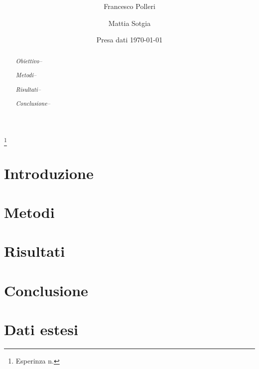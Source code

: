 \documentclass[
    reprint, 
    superscriptaddress, 
    altaffilletter, 
    amsmath, 
    amssymb, 
    a4paper]{revtex4-2}
\begin{document}
\title{
}
\thanks{
    Esperinza n. %
}

\author{Francesco Polleri}
\author{Mattia Sotgia}


\date{Presa dati
    \today
}

\begin{abstract}
    \textit{Obiettivo-- }
    
    \textit{Metodi-- }
    
    \textit{Risultati-- }
        
    \textit{Conclusione-- }
        
\end{abstract}
\maketitle
\thispagestyle{fancy}


\section{Introduzione}
\label{section:introduction}


\section{Metodi}
\label{section:methods}


\section{Risultati}
\label{section:results}

\section{Conclusione}
\label{section:conclusion}

\appendix

\setcounter{table}{0}
\renewcommand{\thetable}{A-\Roman{table}}

\section{Dati estesi}
\end{document}

